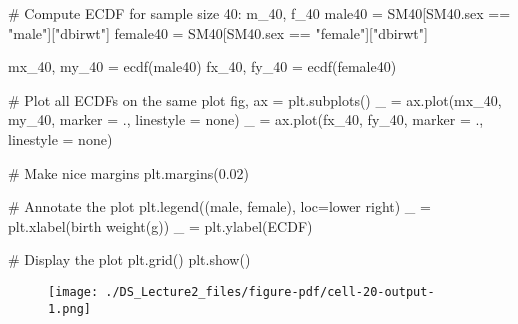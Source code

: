 \documentclass[
  letterpaper,
  DIV=11,
  numbers=noendperiod]{scrreprt}
\newenvironment{Shaded}{\begin{snugshade}}{\end{snugshade}}
\newcommand{\CommentTok}[1]{\textcolor[rgb]{0.37,0.37,0.37}{#1}}
\newcommand{\FloatTok}[1]{\textcolor[rgb]{0.68,0.00,0.00}{#1}}
\newcommand{\NormalTok}[1]{\textcolor[rgb]{0.00,0.23,0.31}{#1}}
\newcommand{\OperatorTok}[1]{\textcolor[rgb]{0.37,0.37,0.37}{#1}}
\newcommand{\StringTok}[1]{\textcolor[rgb]{0.13,0.47,0.30}{#1}}
\begin{document}
\begin{Shaded}
\begin{Highlighting}[]
\CommentTok{\# Compute ECDF for sample size 40: m\_40, f\_40}
\NormalTok{male40 }\OperatorTok{=}\NormalTok{ SM40[SM40.sex }\OperatorTok{==} \StringTok{"male"}\NormalTok{][}\StringTok{"dbirwt"}\NormalTok{]}
\NormalTok{female40 }\OperatorTok{=}\NormalTok{ SM40[SM40.sex }\OperatorTok{==} \StringTok{"female"}\NormalTok{][}\StringTok{"dbirwt"}\NormalTok{]}

\NormalTok{mx\_40, my\_40 }\OperatorTok{=}\NormalTok{ ecdf(male40)}
\NormalTok{fx\_40, fy\_40 }\OperatorTok{=}\NormalTok{ ecdf(female40)}

\CommentTok{\# Plot all ECDFs on the same plot}
\NormalTok{fig, ax }\OperatorTok{=}\NormalTok{ plt.subplots()}
\NormalTok{\_ }\OperatorTok{=}\NormalTok{ ax.plot(mx\_40, my\_40, marker }\OperatorTok{=} \StringTok{\textquotesingle{}.\textquotesingle{}}\NormalTok{, linestyle }\OperatorTok{=} \StringTok{\textquotesingle{}none\textquotesingle{}}\NormalTok{)}
\NormalTok{\_ }\OperatorTok{=}\NormalTok{ ax.plot(fx\_40, fy\_40, marker }\OperatorTok{=} \StringTok{\textquotesingle{}.\textquotesingle{}}\NormalTok{, linestyle }\OperatorTok{=} \StringTok{\textquotesingle{}none\textquotesingle{}}\NormalTok{)}

\CommentTok{\# Make nice margins}
\NormalTok{plt.margins(}\FloatTok{0.02}\NormalTok{)}

\CommentTok{\# Annotate the plot}
\NormalTok{plt.legend((}\StringTok{\textquotesingle{}male\textquotesingle{}}\NormalTok{, }\StringTok{\textquotesingle{}female\textquotesingle{}}\NormalTok{), loc}\OperatorTok{=}\StringTok{\textquotesingle{}lower right\textquotesingle{}}\NormalTok{)}
\NormalTok{\_ }\OperatorTok{=}\NormalTok{ plt.xlabel(}\StringTok{\textquotesingle{}birth weight(g)\textquotesingle{}}\NormalTok{)}
\NormalTok{\_ }\OperatorTok{=}\NormalTok{ plt.ylabel(}\StringTok{\textquotesingle{}ECDF\textquotesingle{}}\NormalTok{)}

\CommentTok{\# Display the plot}
\NormalTok{plt.grid()}
\NormalTok{plt.show()}
\end{Highlighting}
\end{Shaded}

\begin{figure}[H]

{\centering \texttt{[image: ./DS\_Lecture2\_files/figure-pdf/cell-20-output-1.png]}

}

\end{figure}
\end{document}
